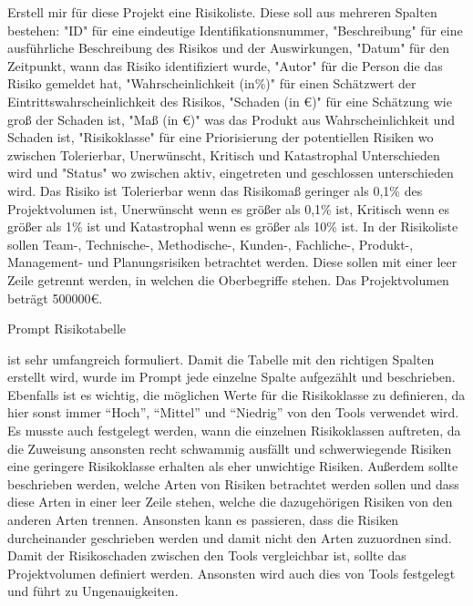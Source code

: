 \begin{prompt}[H]
    \begin{tcolorbox}[colback=gray!20, colframe=gray!20, boxrule=0pt, sharp corners] 
        Erstell mir für diese Projekt eine Risikoliste. Diese soll aus mehreren Spalten bestehen: "ID" für eine 
        eindeutige Identifikationsnummer, "Beschreibung" für eine ausführliche Beschreibung des Risikos und der 
        Auswirkungen, "Datum" für den Zeitpunkt, wann das Risiko identifiziert wurde, "Autor" für die Person die 
        das Risiko gemeldet hat, "Wahrscheinlichkeit (in\%)" für einen Schätzwert der Eintrittswahrscheinlichkeit 
        des Risikos, "Schaden (in €)" für eine Schätzung wie groß der Schaden ist, "Maß (in €)" was das Produkt aus 
        Wahrscheinlichkeit und Schaden ist, "Risikoklasse" für eine Priorisierung der potentiellen Risiken wo 
        zwischen Tolerierbar, Unerwünscht, Kritisch und Katastrophal Unterschieden wird und "Status" wo zwischen 
        aktiv, eingetreten und geschlossen unterschieden wird. Das Risiko ist Tolerierbar wenn das Risikomaß geringer 
        als 0,1\% des Projektvolumen ist, Unerwünscht wenn es größer als 0,1\% ist, Kritisch wenn es größer als 1\% 
        ist und Katastrophal wenn es größer als 10\% ist. In der Risikoliste sollen Team-, Technische-, Methodische-, 
        Kunden-, Fachliche-, Produkt-, Management- und Planungsrisiken betrachtet werden. Diese sollen mit einer 
        leer Zeile getrennt werden, in welchen die Oberbegriffe stehen. Das Projektvolumen beträgt 500000€.
        \vfill
    \end{tcolorbox}
    \caption{Prompt Risikotabelle}
    \label{Prompt Risikotabelle}
\end{prompt}

ist sehr umfangreich formuliert. Damit die Tabelle mit den richtigen Spalten erstellt wird, wurde im Prompt jede
einzelne Spalte aufgezählt und beschrieben. Ebenfalls ist es wichtig, die möglichen Werte für die Risikoklasse zu 
definieren, da hier sonst immer ``Hoch'', ``Mittel'' und ``Niedrig'' von den Tools verwendet wird. Es musste auch 
festgelegt werden, wann die einzelnen Risikoklassen auftreten, da die Zuweisung ansonsten recht schwammig ausfällt und
schwerwiegende Risiken eine geringere Risikoklasse erhalten als eher unwichtige Risiken. Außerdem sollte beschrieben 
werden, welche Arten von Risiken betrachtet werden sollen und dass diese Arten in einer leer Zeile stehen, welche 
die dazugehörigen Risiken von den anderen Arten trennen. Ansonsten kann es passieren, dass die Risiken durcheinander 
geschrieben werden und damit nicht den Arten zuzuordnen sind. Damit der Risikoschaden zwischen den Tools vergleichbar 
ist, sollte das Projektvolumen definiert werden. Ansonsten wird auch dies von Tools festgelegt und führt zu 
Ungenauigkeiten.\\

